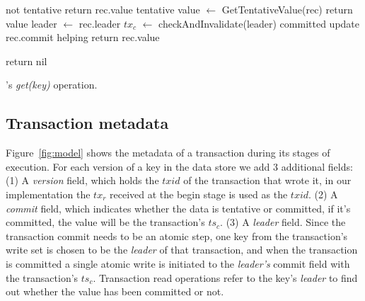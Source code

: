 \begin{algorithm}[htb]
  \begin{algorithmic}
    \begin{small}
       \Comment not tentative
        \State return rec.value \EndIf
      \Else \Comment tentative
      \State value $\leftarrow$ {\sc GetTentativeValue(rec)}
	  \State return value
      \EndIf
      \EndIf
      \EndFor
      \EndProcedure
      \Statex
      \State leader $\leftarrow$ rec.leader
      \State $tx_c$ $\leftarrow$ checkAndInvalidate(leader)
       \Comment  committed
      \State update rec.commit \Comment helping 
        return rec.value \EndIf
      \Else

      \State  return nil
      \EndIf
      \EndProcedure
    \end{small}
  \end{algorithmic}
  \caption{\sys's \emph{get(key)} operation.} 
  \label{fig:get-pseudocode}
\end{algorithm} 




\subsection{Transaction metadata}
\label{ssec:tso}
Figure~\ref{fig:model} shows the metadata of a transaction during its stages of execution. For each version of a key in the data store we add 3 additional fields: (1) A \emph{version} field, which holds the $txid$ of the transaction that wrote it, in our implementation the $tx_r$ received at the begin stage is used as the $txid$. (2) A \emph{commit} field, which indicates whether the data is tentative or committed, if it's committed, the value will be the transaction's $ts_c$. (3) A \emph{leader} field. Since the transaction commit needs to be an atomic step, one key from the transaction's write set is chosen to be the \emph{leader} of that transaction, and when the transaction is committed a single atomic write is initiated to the \emph{leader's} commit field with the transaction's $ts_c$. Transaction read operations refer to the key's \emph{leader} to find out whether the value has been committed or not.




